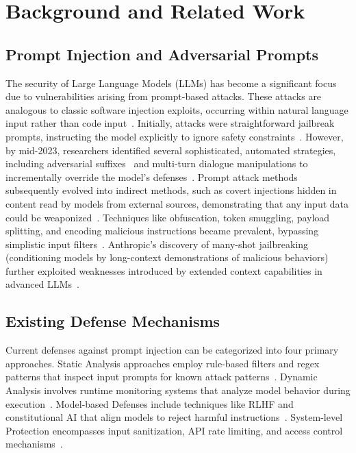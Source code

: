 \section{Background and Related Work}

\subsection{Prompt Injection and Adversarial Prompts}

The security of Large Language Models (LLMs) has become a significant focus due to vulnerabilities arising from prompt-based attacks. These attacks are analogous to classic software injection exploits, occurring within natural language input rather than code input~\cite{arthur2024promptinjection, lakera2024promptguide}. Initially, attacks were straightforward jailbreak prompts, instructing the model explicitly to ignore safety constraints~\cite{arthur2024promptinjection}. However, by mid-2023, researchers identified several sophisticated, automated strategies, including adversarial suffixes~\cite{zou2023universal} and multi-turn dialogue manipulations to incrementally override the model's defenses~\cite{zou2024oneshot}. Prompt attack methods subsequently evolved into indirect methods, such as covert injections hidden in content read by models from external sources, demonstrating that any input data could be weaponized~\cite{lakera2024promptguide, venturebeat2024prompt}. Techniques like obfuscation, token smuggling, payload splitting, and encoding malicious instructions became prevalent, bypassing simplistic input filters~\cite{learnprompting2024obfuscation}. Anthropic's discovery of many-shot jailbreaking (conditioning models by long-context demonstrations of malicious behaviors) further exploited weaknesses introduced by extended context capabilities in advanced LLMs~\cite{anthropic2024manyshot}.

\subsection{Existing Defense Mechanisms}
Current defenses against prompt injection can be categorized into four primary approaches. Static Analysis approaches employ rule-based filters and regex patterns that inspect input prompts for known attack patterns~\cite{nvidia2023nemo}. Dynamic Analysis involves runtime monitoring systems that analyze model behavior during execution~\cite{inan2023llm}. Model-based Defenses include techniques like RLHF and constitutional AI that align models to reject harmful instructions~\cite{bai2022constitutional}. System-level Protection encompasses input sanitization, API rate limiting, and access control mechanisms~\cite{owasp2024top10llm}.

